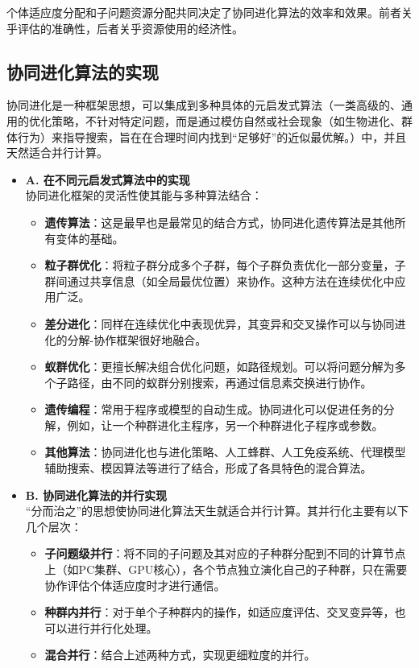 个体适应度分配和子问题资源分配共同决定了协同进化算法的效率和效果。前者关乎评估的准确性，后者关乎资源使用的经济性。


\subsection{协同进化算法的实现}

协同进化是一种框架思想，可以集成到多种具体的元启发式算法（一类高级的、通用的优化策略，不针对特定问题，而是通过模仿自然或社会现象（如生物进化、群体行为）来指导搜索，旨在在合理时间内找到“足够好”的近似最优解。）中，并且天然适合并行计算。

\begin{itemize}
    \item \textbf{A. 在不同元启发式算法中的实现} \\
    协同进化框架的灵活性使其能与多种算法结合：
    \begin{itemize}
        \item \textbf{遗传算法}：这是最早也是最常见的结合方式，协同进化遗传算法是其他所有变体的基础。
        \item \textbf{粒子群优化}：将粒子群分成多个子群，每个子群负责优化一部分变量，子群间通过共享信息（如全局最优位置）来协作。这种方法在连续优化中应用广泛。
        \item \textbf{差分进化}：同样在连续优化中表现优异，其变异和交叉操作可以与协同进化的分解-协作框架很好地融合。
        \item \textbf{蚁群优化}：更擅长解决组合优化问题，如路径规划。可以将问题分解为多个子路径，由不同的蚁群分别搜索，再通过信息素交换进行协作。
        \item \textbf{遗传编程}：常用于程序或模型的自动生成。协同进化可以促进任务的分解，例如，让一个种群进化主程序，另一个种群进化子程序或参数。
        \item \textbf{其他算法}：协同进化也与进化策略、人工蜂群、人工免疫系统、代理模型辅助搜索、模因算法等进行了结合，形成了各具特色的混合算法。
    \end{itemize}
    \item \textbf{B. 协同进化算法的并行实现} \\
    “分而治之”的思想使协同进化算法天生就适合并行计算。其并行化主要有以下几个层次：
    \begin{itemize}
        \item \textbf{子问题级并行}：将不同的子问题及其对应的子种群分配到不同的计算节点上（如PC集群、GPU核心），各个节点独立演化自己的子种群，只在需要协作评估个体适应度时才进行通信。
        \item \textbf{种群内并行}：对于单个子种群内的操作，如适应度评估、交叉变异等，也可以进行并行化处理。
        \item \textbf{混合并行}：结合上述两种方式，实现更细粒度的并行。
    \end{itemize}
\end{itemize}

